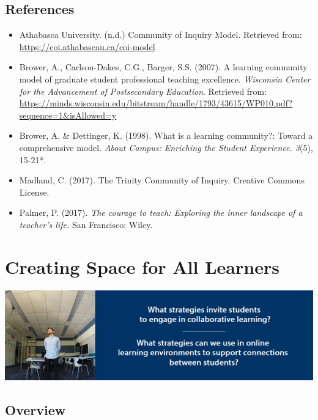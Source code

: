 \documentclass[
]{book}
\providecommand{\tightlist}{%
  \setlength{\itemsep}{0pt}\setlength{\parskip}{0pt}}
\begin{document}
\hypertarget{references-1}{%
\section*{References}\label{references-1}}

\begin{itemize}
\tightlist
\item
  Athabasca University. (n.d.) Community of Inquiry Model. Retrieved from: \url{https://coi.athabascau.ca/coi-model}\\
\item
  Brower, A., Carlson-Dakes, C.G., Barger, S.S. (2007). A learning community model of graduate student professional teaching excellence. \emph{Wisconsin Center for the Advancement of Postsecondary Education}. Retrieved from: \url{https://minds.wisconsin.edu/bitstream/handle/1793/43615/WP010.pdf?sequence=1\&isAllowed=y}\\
\item
  Brower, A. \& Dettinger, K. (1998). What is a learning community?: Toward a comprehensive model. \emph{About Campus: Enriching the Student Experience. 3}(5), 15-21*.\\
\item
  Madland, C. (2017). The Trinity Community of Inquiry. Creative Commons License.\\
\item
  Palmer, P. (2017). \emph{The courage to teach: Exploring the inner landscape of a teacher's life.} San Francisco: Wiley.
\end{itemize}

\hypertarget{creating-space-for-all-learners}{%
\chapter{Creating Space for All Learners}\label{creating-space-for-all-learners}}

\includegraphics{assets/unit5/LDRS664-BannerUnit5.jpg}

\hypertarget{overview-4}{%
\section*{Overview}\label{overview-4}}
\end{document}
